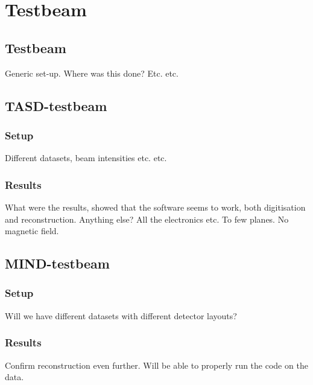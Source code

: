 \chapter{Testbeam}
\label{c:Testbeam}

\section{Testbeam}
Generic set-up. Where was this done? Etc. etc.

\section{TASD-testbeam}
\subsection{Setup}
Different datasets, beam intensities etc. etc.
\subsection{Results}
What were the results, showed that the software seems to work, both digitisation and reconstruction. Anything else? All the electronics etc. To few planes. No magnetic field.

\section{MIND-testbeam}
\subsection{Setup}
Will we have different datasets with different detector layouts? 
\subsection{Results}

Confirm reconstruction even further. Will be able to properly run the code on the data.